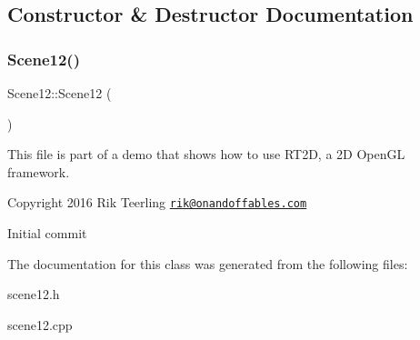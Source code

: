 \subsection{Constructor \& Destructor Documentation}
\mbox{\label{class_scene12_aa060f8a7b4560c810120a82ebebfee3d}} 
\subsubsection{\texorpdfstring{Scene12()}{Scene12()}}
{\footnotesize\ttfamily Scene12\+::\+Scene12 (\begin{DoxyParamCaption}{ }\end{DoxyParamCaption})}

This file is part of a demo that shows how to use R\+T2D, a 2D Open\+GL framework.


\begin{DoxyItemize}
\item Copyright 2016 Rik Teerling \href{mailto:rik@onandoffables.com}{\tt rik@onandoffables.\+com}
\begin{DoxyItemize}
\item Initial commit 
\end{DoxyItemize}
\end{DoxyItemize}

The documentation for this class was generated from the following files\+:\begin{DoxyCompactItemize}
\item 
scene12.\+h\item 
scene12.\+cpp\end{DoxyCompactItemize}
